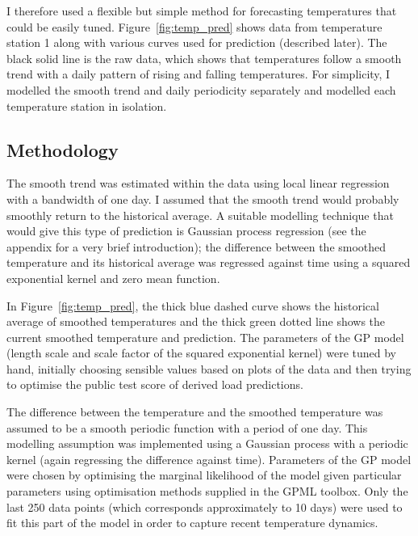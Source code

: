\documentclass[final,authoryear,1p,times]{elsarticle}
\begin{document}
I therefore used a flexible but simple method for forecasting temperatures that could be easily tuned.
Figure~\ref{fig:temp_pred} shows data from temperature station 1 along with various curves used for prediction (described later).
The black solid line is the raw data, which shows that temperatures follow a smooth trend with a daily pattern of rising and falling temperatures.
For simplicity, I modelled the smooth trend and daily periodicity separately and modelled each temperature station in isolation.

\subsection{Methodology}

The smooth trend was estimated within the data using local linear regression \citep[e.g. chapter 6 of][]{Hastie2009} with a bandwidth of one day.
I assumed that the smooth trend would probably smoothly return to the historical average.
A suitable modelling technique that would give this type of prediction is Gaussian process regression \citep[e.g.][]{Rasmussen2006} (see the appendix for a very brief introduction); the difference between the smoothed temperature and its historical average was regressed against time using a squared exponential kernel and zero mean function.

In Figure~\ref{fig:temp_pred}, the thick blue dashed curve shows the historical average of smoothed temperatures and the thick green dotted line shows the current smoothed temperature and prediction.
The parameters of the GP model (length scale and scale factor of the squared exponential kernel) were tuned by hand, initially choosing sensible values based on plots of the data and then trying to optimise the public test score of derived load predictions.

The difference between the temperature and the smoothed temperature was assumed to be a smooth periodic function with a period of one day.
This modelling assumption was implemented using a Gaussian process with a periodic kernel (again regressing the difference against time).
Parameters of the GP model were chosen by optimising the marginal likelihood of the model given particular parameters using optimisation methods supplied in the GPML toolbox\footnotemark.
Only the last 250 data points (which corresponds approximately to 10 days) were used to fit this part of the model in order to capture recent temperature dynamics.
\end{document}
